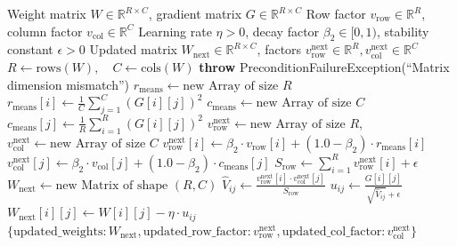 \documentclass[11pt,a4paper]{article}
\theoremstyle{definition}
\begin{document}
\begin{algorithm}[H]
\caption{Adafactor Factored Second-Moment Optimization Step}
\begin{algorithmic}[1]
\Require Weight matrix $W \in \mathbb{R}^{R \times C}$, gradient matrix $G \in \mathbb{R}^{R \times C}$
\Require Row factor $v_{\text{row}} \in \mathbb{R}^R$, column factor $v_{\text{col}} \in \mathbb{R}^C$
\Require Learning rate $\eta > 0$, decay factor $\beta_2 \in [0, 1)$, stability constant $\epsilon > 0$
\Ensure Updated matrix $W_{\text{next}} \in \mathbb{R}^{R \times C}$, factors $v_{\text{row}}^{\text{next}} \in \mathbb{R}^R, v_{\text{col}}^{\text{next}} \in \mathbb{R}^C$
\State $R \gets \text{rows}(W), \quad C \gets \text{cols}(W)$
    \State \textbf{throw} PreconditionFailureException(``Matrix dimension mismatch'')
\EndIf
\State $r_{\text{means}} \gets \text{new Array of size } R$
    \State $r_{\text{means}}[i] \gets \frac{1}{C} \sum_{j=1}^C (G[i][j])^2$
\EndFor
\State $c_{\text{means}} \gets \text{new Array of size } C$
    \State $c_{\text{means}}[j] \gets \frac{1}{R} \sum_{i=1}^R (G[i][j])^2$
\EndFor
\State $v_{\text{row}}^{\text{next}} \gets \text{new Array of size } R$, \quad $v_{\text{col}}^{\text{next}} \gets \text{new Array of size } C$
    \State $v_{\text{row}}^{\text{next}}[i] \gets \beta_2 \cdot v_{\text{row}}[i] + (1.0 - \beta_2) \cdot r_{\text{means}}[i]$
\EndFor
{}
    \State $v_{\text{col}}^{\text{next}}[j] \gets \beta_2 \cdot v_{\text{col}}[j] + (1.0 - \beta_2) \cdot c_{\text{means}}[j]$
\EndFor
\State $S_{\text{row}} \gets \sum_{i=1}^R v_{\text{row}}^{\text{next}}[i] + \epsilon$
\State $W_{\text{next}} \gets \text{new Matrix of shape } (R, C)$
        \State $\hat{V}_{ij} \gets \frac{v_{\text{row}}^{\text{next}}[i] \cdot v_{\text{col}}^{\text{next}}[j]}{S_{\text{row}}}$
        \State $u_{ij} \gets \frac{G[i][j]}{\sqrt{\hat{V}_{ij}} + \epsilon}$
        \State $W_{\text{next}}[i][j] \gets W[i][j] - \eta \cdot u_{ij}$
    \EndFor
\EndFor
\State \Return $\{\text{updated\_weights}: W_{\text{next}}, \text{updated\_row\_factor}: v_{\text{row}}^{\text{next}}, \text{updated\_col\_factor}: v_{\text{col}}^{\text{next}}\}$
\end{algorithmic}
\end{algorithm}
\end{document}
